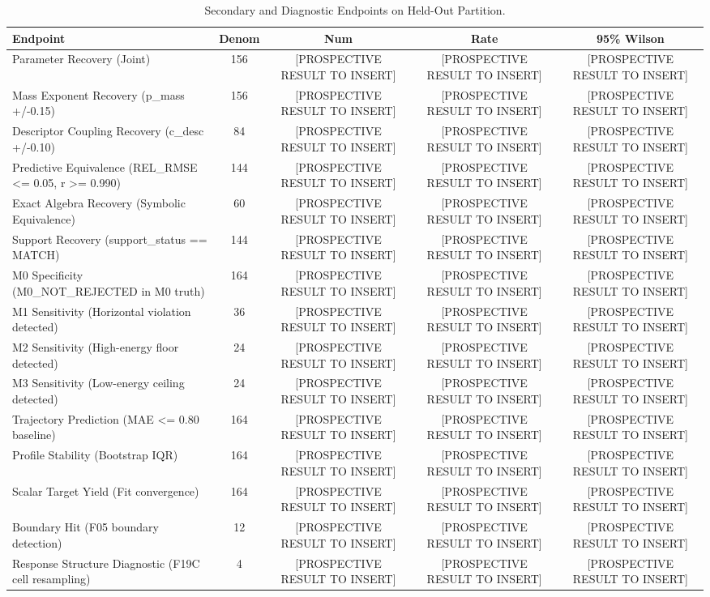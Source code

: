 \begin{table}[t]
\centering
\small
\caption{Secondary and Diagnostic Endpoints on Held-Out Partition.}
\label{tab:secondary_endpoints}
\begin{tabular}{lcccc}
\toprule
Endpoint & Denom & Num & Rate & 95\% Wilson \\
\midrule
Parameter Recovery (Joint) & 156 & [PROSPECTIVE RESULT TO INSERT] & [PROSPECTIVE RESULT TO INSERT] & [PROSPECTIVE RESULT TO INSERT] \\
Mass Exponent Recovery (p_mass +/-0.15) & 156 & [PROSPECTIVE RESULT TO INSERT] & [PROSPECTIVE RESULT TO INSERT] & [PROSPECTIVE RESULT TO INSERT] \\
Descriptor Coupling Recovery (c_desc +/-0.10) & 84 & [PROSPECTIVE RESULT TO INSERT] & [PROSPECTIVE RESULT TO INSERT] & [PROSPECTIVE RESULT TO INSERT] \\
Predictive Equivalence (REL_RMSE <= 0.05, r >= 0.990) & 144 & [PROSPECTIVE RESULT TO INSERT] & [PROSPECTIVE RESULT TO INSERT] & [PROSPECTIVE RESULT TO INSERT] \\
Exact Algebra Recovery (Symbolic Equivalence) & 60 & [PROSPECTIVE RESULT TO INSERT] & [PROSPECTIVE RESULT TO INSERT] & [PROSPECTIVE RESULT TO INSERT] \\
Support Recovery (support_status == MATCH) & 144 & [PROSPECTIVE RESULT TO INSERT] & [PROSPECTIVE RESULT TO INSERT] & [PROSPECTIVE RESULT TO INSERT] \\
M0 Specificity (M0_NOT_REJECTED in M0 truth) & 164 & [PROSPECTIVE RESULT TO INSERT] & [PROSPECTIVE RESULT TO INSERT] & [PROSPECTIVE RESULT TO INSERT] \\
M1 Sensitivity (Horizontal violation detected) & 36 & [PROSPECTIVE RESULT TO INSERT] & [PROSPECTIVE RESULT TO INSERT] & [PROSPECTIVE RESULT TO INSERT] \\
M2 Sensitivity (High-energy floor detected) & 24 & [PROSPECTIVE RESULT TO INSERT] & [PROSPECTIVE RESULT TO INSERT] & [PROSPECTIVE RESULT TO INSERT] \\
M3 Sensitivity (Low-energy ceiling detected) & 24 & [PROSPECTIVE RESULT TO INSERT] & [PROSPECTIVE RESULT TO INSERT] & [PROSPECTIVE RESULT TO INSERT] \\
Trajectory Prediction (MAE <= 0.80 baseline) & 164 & [PROSPECTIVE RESULT TO INSERT] & [PROSPECTIVE RESULT TO INSERT] & [PROSPECTIVE RESULT TO INSERT] \\
Profile Stability (Bootstrap IQR) & 164 & [PROSPECTIVE RESULT TO INSERT] & [PROSPECTIVE RESULT TO INSERT] & [PROSPECTIVE RESULT TO INSERT] \\
Scalar Target Yield (Fit convergence) & 164 & [PROSPECTIVE RESULT TO INSERT] & [PROSPECTIVE RESULT TO INSERT] & [PROSPECTIVE RESULT TO INSERT] \\
Boundary Hit (F05 boundary detection) & 12 & [PROSPECTIVE RESULT TO INSERT] & [PROSPECTIVE RESULT TO INSERT] & [PROSPECTIVE RESULT TO INSERT] \\
Response Structure Diagnostic (F19C cell resampling) & 4 & [PROSPECTIVE RESULT TO INSERT] & [PROSPECTIVE RESULT TO INSERT] & [PROSPECTIVE RESULT TO INSERT] \\
\bottomrule
\end{tabular}
\end{table}
